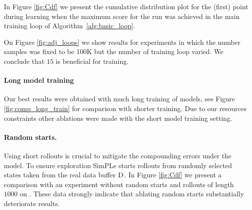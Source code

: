 In Figure \ref{fig:Cdf} we present the cumulative distribution plot for the (first) point during learning when the maximum score for the run was achieved in the main training loop of Algorithm~\ref{alg:basic_loop}.

On Figure \ref{fig:adj_loops} we show results for experiments in which the number samples was fixed to be 100K but the number of training loop varied. We conclude that $15$ is beneficial for training.

\paragraph{Long model training} Our best results were obtained with much long training of models, see Figure \ref{fig:comp_long_train} for comparison with shorter training. Due to our resources constraints other ablations were made with the short model training setting.

\paragraph{Random starts.} Using short rollouts is crucial to mitigate the compounding errors under the model. To ensure exploration SimPLe starts rollouts from randomly selected states taken from the real data buffer $\textsc{D}$. In Figure \ref{fig:Cdf} we present a comparison with an experiment without random starts and rollouts of length $1000$ on \seaquest. These data strongly indicate that ablating random starts substantially deteriorate results.  


